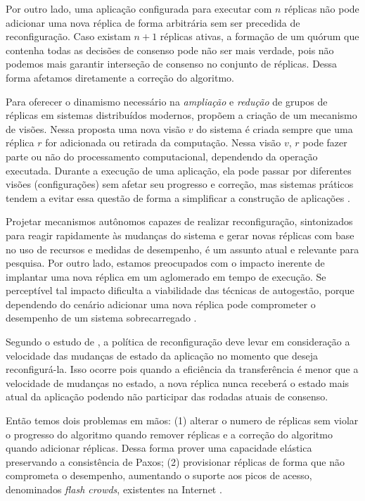 Por outro lado, uma aplicação configurada para executar com $n$ réplicas não pode
adicionar uma nova réplica de forma arbitrária sem ser precedida de reconfiguração. Caso
existam $n + 1$ réplicas ativas, a formação de um quórum que contenha todas as decisões de
consenso pode não ser mais verdade, pois não podemos mais garantir interseção de consenso
no conjunto de réplicas. Dessa forma afetamos diretamente a correção do algoritmo.

Para oferecer o dinamismo necessário na \emph{ampliação} e \emph{redução} de grupos
de réplicas em sistemas distribuídos modernos,  propõem a criação de
um mecanismo de visões. Nessa proposta uma nova visão $v$ do sistema é criada sempre que uma
réplica $r$ for adicionada ou retirada da computação. Nessa visão $v$, $r$ pode fazer
parte ou não do processamento computacional, dependendo da operação executada. Durante a
execução de uma aplicação, ela pode passar por diferentes visões (configurações) sem
afetar seu progresso e correção, mas sistemas práticos tendem a evitar essa questão de
forma a simplificar a construção de aplicações \cite{chandra07}.

Projetar mecanismos autônomos capazes de realizar reconfiguração, sintonizados para reagir
rapidamente às mudanças do sistema e gerar novas réplicas com base no uso de recursos e
medidas de desempenho, é um assunto atual e relevante para pesquisa. Por outro lado,
estamos preocupados com o impacto inerente de implantar uma nova réplica em um aglomerado
em tempo de execução. Se perceptível tal impacto dificulta a viabilidade das técnicas de
autogestão, porque dependendo do cenário adicionar uma nova réplica pode comprometer o
desempenho de um sistema sobrecarregado \cite{vilaca09}.

Segundo o estudo de , a política de reconfiguração deve levar em
consideração a velocidade das mudanças de estado da aplicação no momento que deseja
reconfigurá-la. Isso  ocorre  pois quando a eficiência da transferência é menor que a
velocidade de mudanças no estado, a nova réplica  nunca receberá o estado mais atual da
aplicação podendo não participar das rodadas atuais de consenso.

Então temos dois problemas em mãos: (1) alterar o numero de réplicas sem violar o
progresso do algoritmo quando remover réplicas e a correção do algoritmo quando adicionar
réplicas. Dessa forma prover uma capacidade elástica preservando a consistência de Paxos;
(2) provisionar réplicas de forma que não comprometa o desempenho, aumentando o suporte
aos picos de acesso, denominados \emph{flash crowds}, existentes na Internet
\cite{tanenbaum07}.


